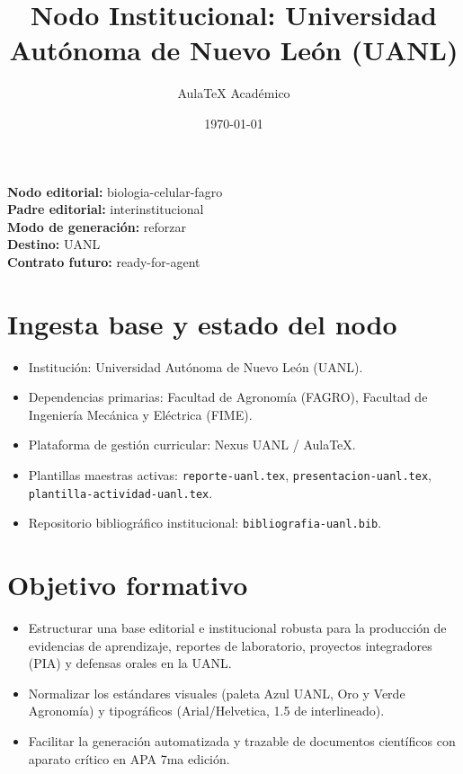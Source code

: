 \documentclass[12pt]{article}
\title{\textbf{Nodo Institucional: Universidad Autónoma de Nuevo León (UANL)}}
\author{AulaTeX Académico}
\date{\today}
\begin{document}
\maketitle

\noindent\textbf{Nodo editorial:} biologia-celular-fagro\\
\textbf{Padre editorial:} interinstitucional\\
\textbf{Modo de generación:} reforzar\\
\textbf{Destino:} UANL\\
\textbf{Contrato futuro:} ready-for-agent

\section*{Ingesta base y estado del nodo}
\begin{itemize}[leftmargin=*]
  \item Institución: Universidad Autónoma de Nuevo León (UANL).
  \item Dependencias primarias: Facultad de Agronomía (FAGRO), Facultad de Ingeniería Mecánica y Eléctrica (FIME).
  \item Plataforma de gestión curricular: Nexus UANL / AulaTeX.
  \item Plantillas maestras activas: \texttt{reporte-uanl.tex}, \texttt{presentacion-uanl.tex}, \texttt{plantilla-actividad-uanl.tex}.
  \item Repositorio bibliográfico institucional: \texttt{bibliografia-uanl.bib}.
\end{itemize}

\section*{Objetivo formativo}
\begin{itemize}[leftmargin=*]
  \item Estructurar una base editorial e institucional robusta para la producción de evidencias de aprendizaje, reportes de laboratorio, proyectos integradores (PIA) y defensas orales en la UANL.
  \item Normalizar los estándares visuales (paleta Azul UANL, Oro y Verde Agronomía) y tipográficos (Arial/Helvetica, 1.5 de interlineado).
  \item Facilitar la generación automatizada y trazable de documentos científicos con aparato crítico en APA 7ma edición.
\end{itemize}
\end{document}
